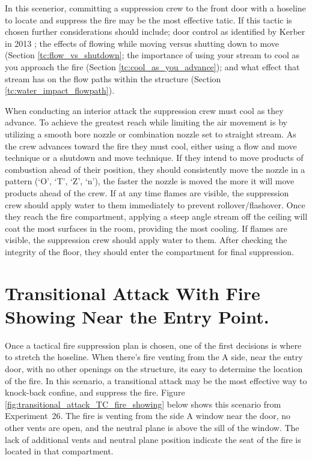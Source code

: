 \documentclass[12pt,oneside]{book}
\begin{document}
In this scenerior, committing a suppression crew to the front door with a hoseline to locate and suppress the fire may be the most effective tatic. If this tactic is chosen further considerations should include; door control as identified by Kerber in 2013 \cite{UL_VerticalVent}; the effects of flowing while moving versus shutting down to move (Section \ref{tc:flow_vs_shutdown}; the importance of using your stream to cool as you approach the fire (Section \ref{tc:cool_as_you_advance}); and what effect that stream has on the flow paths within the structure (Section \ref{tc:water_impact_flowpath}).

When conducting an interior attack the suppression crew must cool as they advance. To achieve the greatest reach while limiting the air movement is by utilizing a smooth bore nozzle or combination nozzle set to straight stream. As the crew advances toward the fire they must cool, either using a flow and move technique or a shutdown and move technique. If they intend to move products of combustion ahead of their position, they should consistently move the nozzle in a pattern (`O', `T', `Z', `n'), the faster the nozzle is moved the more it will move products ahead of the crew. If at any time flames are visible, the suppression crew should apply water to them immediately to prevent rollover/flashover. Once they reach the fire compartment, applying a steep angle stream off the ceiling will coat the most surfaces in the room, providing the most cooling. If flames are visible, the suppression crew should apply water to them. After checking the integrity of the floor, they should enter the compartment for final suppression.

\section{Transitional Attack With Fire Showing Near the Entry Point.} \label{tc:transitional_attack_fire_showing}
Once a tactical fire suppression plan is chosen, one of the first decisions is where to stretch the hoseline. When there's fire venting from the A side, near the entry door, with no other openings on the structure, its easy to determine the location of the fire. In this scenario, a transitional attack may be the most effective way to knock-back confine, and suppress the fire. Figure \ref{fig:transitional_attack_TC_fire_showing} below shows this scenario from Experiment~26. The fire is venting from the side A window near the door, no other vents are open, and the neutral plane is above the sill of the window. The lack of additional vents and neutral plane position indicate the seat of the fire is located in that compartment.
\end{document}
